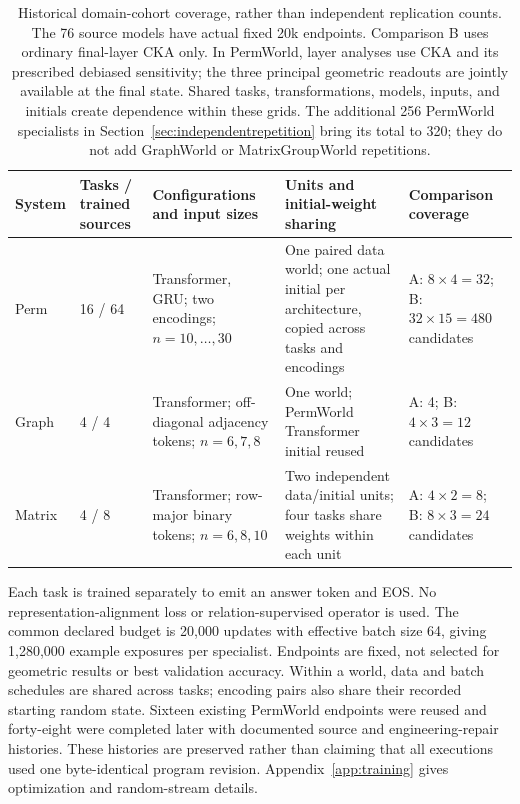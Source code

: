 \documentclass[10pt]{article}
\begin{document}
\begin{table}[t]
\centering\small
\begin{tabular}{L{1.35cm}L{2.25cm}L{3.05cm}L{3.0cm}L{3.25cm}}
\toprule
System & Tasks / trained sources & Configurations and input sizes & Units and initial-weight sharing & Comparison coverage\\
\midrule
Perm & 16 / 64 & Transformer, GRU; two encodings; $n=10,\ldots,30$ & One paired data world; one actual initial per architecture, copied across tasks and encodings & A: $8\times4=32$; B: $32\times15=480$ candidates\\
Graph & 4 / 4 & Transformer; off-diagonal adjacency tokens; $n=6,7,8$ & One world; PermWorld Transformer initial reused & A: 4; B: $4\times3=12$ candidates\\
Matrix & 4 / 8 & Transformer; row-major binary tokens; $n=6,8,10$ & Two independent data/initial units; four tasks share weights within each unit & A: $4\times2=8$; B: $8\times3=24$ candidates\\
\bottomrule
\end{tabular}
\caption{Historical domain-cohort coverage, rather than independent replication counts. The 76 source
models have actual fixed 20k endpoints. Comparison B uses ordinary final-layer
CKA only. In PermWorld, layer analyses use CKA and its prescribed debiased
sensitivity; the three principal geometric readouts are jointly available
at the final state. Shared tasks, transformations, models, inputs, and
initials create dependence within these grids. The additional 256 PermWorld
specialists in Section~\ref{sec:independentrepetition} bring its total to 320;
they do not add GraphWorld or MatrixGroupWorld repetitions.}
\label{tab:coverage}
\end{table}

Each task is trained separately to emit an answer token and EOS. No
representation-alignment loss or relation-supervised operator is used.
The common declared budget is 20,000 updates with effective batch size 64,
giving 1,280,000 example exposures per specialist. Endpoints are fixed,
not selected for geometric results or best validation accuracy. Within a
world, data and batch schedules are shared across tasks; encoding pairs
also share their recorded starting random state. Sixteen existing
PermWorld endpoints were reused and forty-eight were completed later with
documented source and engineering-repair histories. These histories are
preserved rather than claiming that all executions used one byte-identical
program revision. Appendix~\ref{app:training} gives optimization and
random-stream details.
\end{document}
